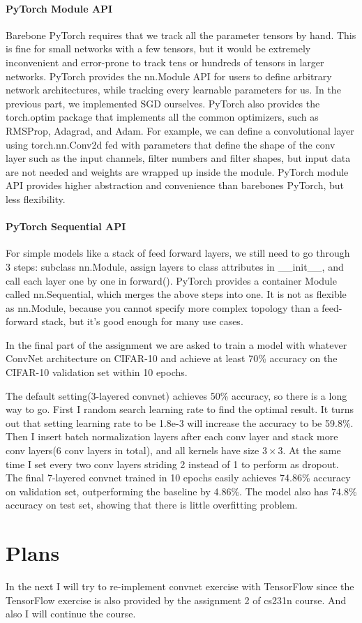 \documentclass{article} %
\begin{document}
\paragraph{PyTorch Module API}
Barebone PyTorch requires that we track all the parameter tensors by hand. This is fine for small networks with a few tensors, but it would be extremely inconvenient and error-prone to track tens or hundreds of tensors in larger networks. PyTorch provides the nn.Module API for users to define arbitrary network architectures, while tracking every learnable parameters for us. In the previous part, we implemented SGD ourselves. PyTorch also provides the torch.optim package that implements all the common optimizers, such as RMSProp, Adagrad, and Adam. For example, we can define a convolutional layer using torch.nn.Conv2d fed with parameters that define the shape of the conv layer such as the input channels, filter numbers and filter shapes, but input data are not needed and weights are wrapped up inside the module. PyTorch module API provides higher abstraction and convenience than barebones PyTorch, but less flexibility.

\paragraph{PyTorch Sequential API}
For simple models like a stack of feed forward layers, we still need to go through 3 steps: subclass nn.Module, assign layers to class attributes in \_\_init\_\_, and call each layer one by one in forward(). PyTorch provides a container Module called nn.Sequential, which merges the above steps into one. It is not as flexible as nn.Module, because you cannot specify more complex topology than a feed-forward stack, but it's good enough for many use cases.

In the final part of the assignment we are asked to train a model with whatever ConvNet architecture on CIFAR-10 and achieve at least 70\% accuracy on the CIFAR-10 validation set within 10 epochs.

The default setting(3-layered convnet) achieves 50\% accuracy, so there is a long way to go. First I random search learning rate to find the optimal result. It turns out that setting learning rate to be 1.8e-3 will increase the accuracy to be 59.8\%. Then I insert batch normalization layers after each conv layer and stack more conv layers(6 conv layers in total), and all kernels have size $3\times 3$. At the same time I set every two conv layers striding 2 instead of 1 to perform as dropout. The final 7-layered convnet trained in 10 epochs easily achieves 74.86\% accuracy on validation set, outperforming the baseline by 4.86\%. The model also has 74.8\% accuracy on test set, showing that there is little overfitting problem.

\section{Plans}
In the next I will try to re-implement convnet exercise with TensorFlow since the TensorFlow exercise is also provided by the assignment 2 of cs231n course. And also I will continue the course.
\end{document}
